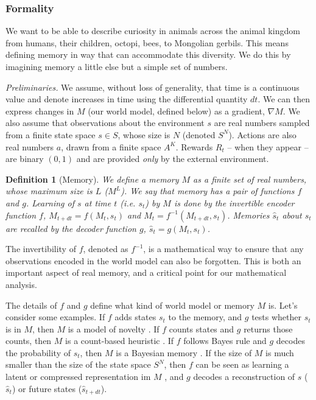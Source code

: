 \documentclass[9pt,lineno]{elife}
\newtheorem{definition}{Definition}
\begin{document}
\subsubsection*{Formality}
We want to be able to describe curiosity in animals across the animal kingdom from humans, their children, octopi, bees, to Mongolian gerbils. This means defining memory in way that can accommodate this diversity. We do this by imagining memory a little else but a simple set of numbers.

\textit{Preliminaries.} We assume, without loss of generality, that time is a continuous value and denote increases in time using the differential quantity $dt$. We can then express changes in $M$ (our world model, defined below) as a gradient, $\nabla M$. We also assume that observations about the environment $s$ are real numbers sampled from a finite state space $s \in S$, whose size is $N$ (denoted $S^N$). Actions are also real numbers $a$, drawn from a finite space $A^K$. Rewards $R_t$ -- when they appear -- are binary $(0,1)$ and are provided \textit{only} by the external environment. 

\begin{definition}[Memory]
We define a memory $M$ as a finite set of real numbers, whose maximum size is $L$ ($M^L$). We say that memory has a pair of functions $f$ and $g$. Learning of $s$ at time $t$ (i.e. $s_t$) by $M$ is done by the invertible encoder function $f$, $M_{t+dt} = f(M_{t}, s_{t})$ and $M_{t} = f^{-1}(M_{t+dt}, s_{t})$. Memories $\hat s_t$ about $s_t$ are recalled by the decoder function $g$, $\hat s_t = g(M_t, s_t)$. 
\end{definition}

The invertibility of $f$, denoted as $f^{-1}$, is a mathematical way to ensure that any observations encoded in the world model can also be forgotten. This is both an important aspect of real memory, and a critical point for our mathematical analysis.

The details of $f$ and $g$ define what kind of world model or memory $M$ is. Let's consider some examples. If $f$ adds states $s_t$ to the memory, and $g$ tests whether $s_t$ is in $M$, then $M$ is a model of novelty \cite{Kakade2002}. If $f$ counts states and $g$ returns those counts, then $M$ is a count-based heuristic \cite{Bellemare2016,Dayan1993}. If $f$ follows Bayes rule and $g$ decodes the probability of $s_t$, then $M$ is a Bayesian memory \cite{Itti2009,Friston2016,Tenenbaum2006,Schmidhuber1991,Pathak2017,Friston2016}. If the size of $M$ is much smaller than the size of the state space $S^N$, then $f$ can be seen as learning a latent or compressed representation im $M$ \cite{Kingma2013,Schmidhuber2008,Levi-Aharoni2019,Ganguli2010,Ha2018,Schmidhuber2015a,Mante2013,Park2017}, and $g$ decodes a reconstruction of $s$ ($\hat s_t$) or future states ($\hat s_{t+dt}$).
 
\end{document}
